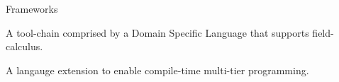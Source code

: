 \begin{frame}{Frameworks}
  \begin{card}
    A tool-chain comprised by a Domain Specific Language that supports field-calculus.
  \end{card}
  \pause
  \begin{card}
    A langauge extension to enable compile-time multi-tier programming.\\
  \end{card}
\end{frame}